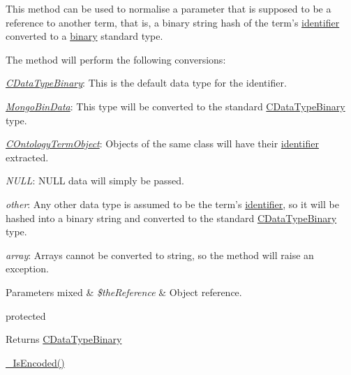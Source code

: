 This method can be used to normalise a parameter that is supposed to be a reference to another term, that is, a binary string hash of the term's \hyperlink{class_c_term_a7524effdc0db8f5ca045f306e3b6b50e}{identifier} converted to a \hyperlink{class_c_data_type_binary}{binary} standard type.

The method will perform the following conversions\-:


\begin{DoxyItemize}
\item {\itshape \hyperlink{class_c_data_type_binary}{C\-Data\-Type\-Binary}}\-: This is the default data type for the identifier. 
\item {\itshape \hyperlink{}{Mongo\-Bin\-Data}}\-: This type will be converted to the standard \hyperlink{class_c_data_type_binary}{C\-Data\-Type\-Binary} type. 
\item {\itshape \hyperlink{class_c_ontology_term_object}{C\-Ontology\-Term\-Object}}\-: Objects of the same class will have their \hyperlink{class_c_persistent_unit_object_ad1ca0920cf0df3c24351402f9afbf34b}{identifier} extracted. 
\item {\itshape N\-U\-L\-L}\-: N\-U\-L\-L data will simply be passed. 
\item {\itshape other}\-: Any other data type is assumed to be the term's \hyperlink{class_c_term_a7524effdc0db8f5ca045f306e3b6b50e}{identifier}, so it will be hashed into a binary string and converted to the standard \hyperlink{class_c_data_type_binary}{C\-Data\-Type\-Binary} type. 
\item {\itshape array}\-: Arrays cannot be converted to string, so the method will raise an exception. 
\end{DoxyItemize}


\begin{DoxyParams}[1]{Parameters}
mixed & {\em \$the\-Reference} & Object reference.\\
\hline
\end{DoxyParams}
protected \begin{DoxyReturn}{Returns}
\hyperlink{class_c_data_type_binary}{C\-Data\-Type\-Binary}
\end{DoxyReturn}
\hyperlink{class_c_persistent_object_aa8dc7db66e2af3d28c2035161a2aabf9}{\-\_\-\-Is\-Encoded()}

